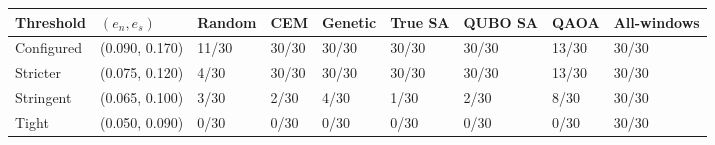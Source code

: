 \begin{tabular}{lllllllll}
\toprule
Threshold & $(e_n,e_s)$ & Random & CEM & Genetic & True SA & QUBO SA & QAOA & All-windows \\
\midrule
Configured & (0.090, 0.170) & 11/30 & 30/30 & 30/30 & 30/30 & 30/30 & 13/30 & 30/30 \\
Stricter & (0.075, 0.120) & 4/30 & 30/30 & 30/30 & 30/30 & 30/30 & 13/30 & 30/30 \\
Stringent & (0.065, 0.100) & 3/30 & 2/30 & 4/30 & 1/30 & 2/30 & 8/30 & 30/30 \\
Tight & (0.050, 0.090) & 0/30 & 0/30 & 0/30 & 0/30 & 0/30 & 0/30 & 30/30 \\
\bottomrule
\end{tabular}
